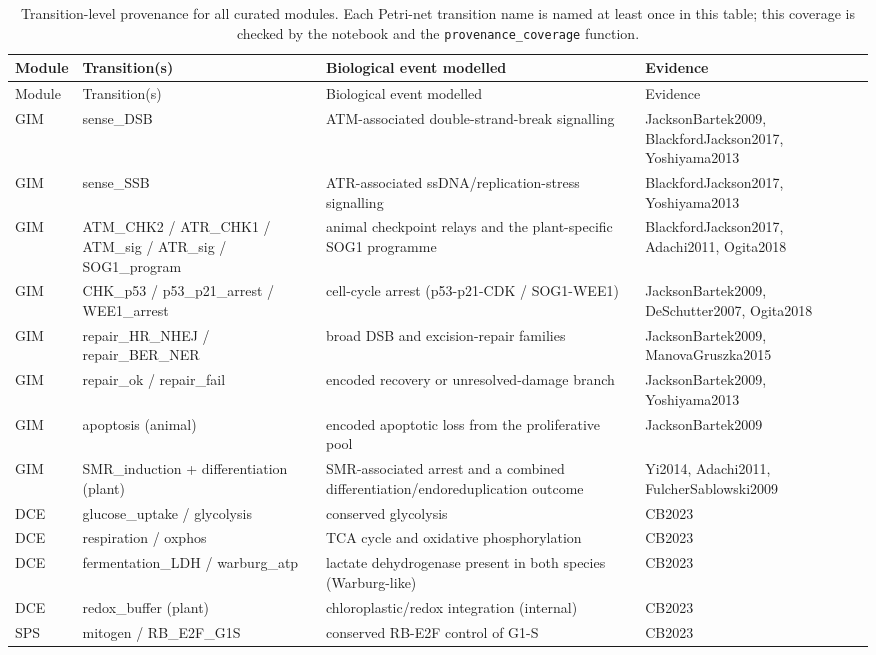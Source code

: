 \begin{longtable}{@{}p{1.4cm}p{4.5cm}p{7.2cm}p{1.8cm}@{}}
\caption{Transition-level provenance for all curated modules. Each Petri-net transition name is named at least once in this table; this coverage is checked by the notebook and the \texttt{provenance\_coverage} function.}\\
\toprule
Module & Transition(s) & Biological event modelled & Evidence \\
\midrule
\endfirsthead
\toprule
Module & Transition(s) & Biological event modelled & Evidence \\
\midrule
\endhead
GIM & sense\_DSB & ATM-associated double-strand-break signalling & JacksonBartek2009, BlackfordJackson2017, Yoshiyama2013 \\
GIM & sense\_SSB & ATR-associated ssDNA/replication-stress signalling & BlackfordJackson2017, Yoshiyama2013 \\
GIM & ATM\_CHK2 / ATR\_CHK1 / ATM\_sig / ATR\_sig / SOG1\_program & animal checkpoint relays and the plant-specific SOG1 programme & BlackfordJackson2017, Adachi2011, Ogita2018 \\
GIM & CHK\_p53 / p53\_p21\_arrest / WEE1\_arrest & cell-cycle arrest (p53-p21-CDK / SOG1-WEE1) & JacksonBartek2009, DeSchutter2007, Ogita2018 \\
GIM & repair\_HR\_NHEJ / repair\_BER\_NER & broad DSB and excision-repair families & JacksonBartek2009, ManovaGruszka2015 \\
GIM & repair\_ok / repair\_fail & encoded recovery or unresolved-damage branch & JacksonBartek2009, Yoshiyama2013 \\
GIM & apoptosis (animal) & encoded apoptotic loss from the proliferative pool & JacksonBartek2009 \\
GIM & SMR\_induction + differentiation (plant) & SMR-associated arrest and a combined differentiation/endoreduplication outcome & Yi2014, Adachi2011, FulcherSablowski2009 \\
DCE & glucose\_uptake / glycolysis & conserved glycolysis & CB2023 \\
DCE & respiration / oxphos & TCA cycle and oxidative phosphorylation & CB2023 \\
DCE & fermentation\_LDH / warburg\_atp & lactate dehydrogenase present in both species (Warburg-like) & CB2023 \\
DCE & redox\_buffer (plant) & chloroplastic/redox integration (internal) & CB2023 \\
SPS & mitogen / RB\_E2F\_G1S & conserved RB-E2F control of G1-S & CB2023 \\

\end{longtable}

